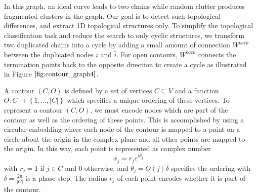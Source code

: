 \documentclass{SMBV12}
\begin{document}
In this graph, an ideal curve leads to two chains while random clutter produces fragmented clusters in the graph. Our goal is to detect such topological differences, and extract 1D topological structures only. To simplify the topological classification task and reduce the search to only cyclic structures, we transform two duplicated chains into a cycle by adding a small amount of connection $W^{back}$ between the duplicated nodes $i$ and $\bar{i}$. For open contours, $W^{back}$ connects the termination points back to the opposite direction to create a cycle as illustrated in Figure $\ref{fig:contour_graph4}$.

A contour $(C, O)$ is defined by a set of vertices $C \subseteq V$ and a function $O: C \rightarrow \left\lbrace 1, ..., \lvert C \rvert \right\rbrace$ which specifies a unique ordering of these vertices. To represent a contour $(C, O)$, we must encode nodes which are part of the contour as well as the ordering
of these points. This is accomplished by using a circular embedding where each node of the contour is mapped to a point on a circle about the origin in the complex plane and all other points are mapped to the origin. In this way, each point is represented as complex number
\begin{equation}
x_j = r_j e^{i \theta_j}
\end{equation}
with $r_j = 1$ if $j \in C$ and $0$ otherwise, and $\theta_j = O(j) \delta$ specifies the ordering with $\delta = \frac{2\pi}{\lvert C \rvert}$ is a phase step. The radius $r_j$ of each point encodes whether it is part of the contour.
\end{document}
